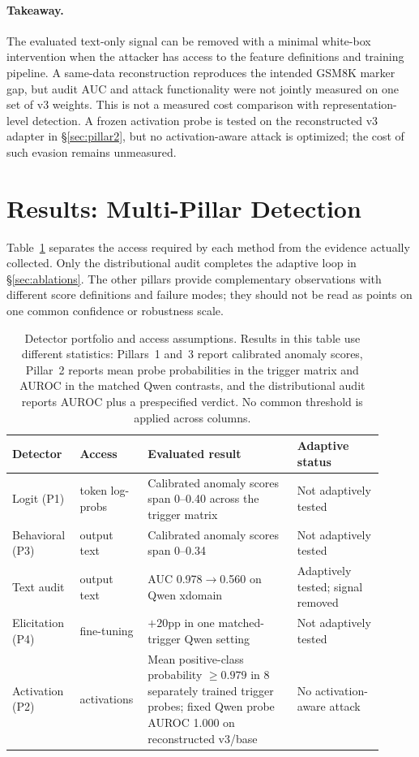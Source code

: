 \documentclass{article}
\begin{document}
\paragraph{Takeaway.}
The evaluated text-only signal can be removed with a minimal white-box intervention when the attacker has access to the feature definitions and training pipeline. A same-data reconstruction reproduces the intended GSM8K marker gap, but audit AUC and attack functionality were not jointly measured on one set of v3 weights. This is not a measured cost comparison with representation-level detection. A frozen activation probe is tested on the reconstructed v3 adapter in \S\ref{sec:pillar2}, but no activation-aware attack is optimized; the cost of such evasion remains unmeasured.

\section{Results: Multi-Pillar Detection}
\label{sec:detection}

Table~\ref{tab:detector-scorecard} separates the access required by each method from the evidence actually collected. Only the distributional audit completes the adaptive loop in \S\ref{sec:ablations}. The other pillars provide complementary observations with different score definitions and failure modes; they should not be read as points on one common confidence or robustness scale.

\begin{table}[t]
\begin{center}
\small
\begin{tabular}{@{}p{0.16\linewidth}p{0.15\linewidth}p{0.38\linewidth}p{0.22\linewidth}@{}}
\toprule
\textbf{Detector} & \textbf{Access} & \textbf{Evaluated result} & \textbf{Adaptive status} \\
\midrule
Logit (P1) & token log-probs & Calibrated anomaly scores span 0--0.40 across the trigger matrix & Not adaptively tested \\
Behavioral (P3) & output text & Calibrated anomaly scores span 0--0.34 & Not adaptively tested \\
Text audit & output text & AUC 0.978$\to$0.560 on Qwen xdomain & Adaptively tested; signal removed \\
Elicitation (P4) & fine-tuning & $+20$pp in one matched-trigger Qwen setting & Not adaptively tested \\
Activation (P2) & activations & Mean positive-class probability $\geq0.979$ in 8 separately trained trigger probes; fixed Qwen probe AUROC 1.000 on reconstructed v3/base & No activation-aware attack \\
\bottomrule
\end{tabular}
\end{center}
\caption{Detector portfolio and access assumptions. Results in this table use different statistics: Pillars~1 and~3 report calibrated anomaly scores, Pillar~2 reports mean probe probabilities in the trigger matrix and AUROC in the matched Qwen contrasts, and the distributional audit reports AUROC plus a prespecified verdict. No common threshold is applied across columns.}
\label{tab:detector-scorecard}
\end{table}
\end{document}

